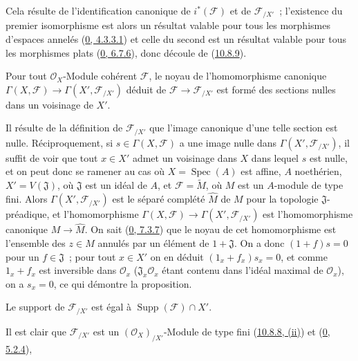 Cela résulte de l'identification canonique de $i^*(\mathscr{F})$ et de
$\mathscr{F}_{/X'}$~; l'existence du premier isomorphisme est alors un
résultat valable pour tous les morphismes d'espaces annelés
(\hyperref[0.4.3.3.1-fr]{0, 4.3.3.1}) et celle du second est un résultat
valable pour tous les morphismes plats
(\hyperref[0.6.7.6-fr]{0, 6.7.6}), donc découle de
(\hyperref[I.10.8.9-fr]{10.8.9}).

\begin{proposition}[10.8.11]
\label{I.10.8.11-fr}
Pour tout $\mathscr{O}_X$-Module cohérent $\mathscr{F}$, le noyau de
l'homomorphisme canonique
$\Gamma(X,\mathscr{F})\to\Gamma(X',\mathscr{F}_{/X'})$ déduit de
$\mathscr{F}\to\mathscr{F}_{/X'}$ est formé des sections nulles dans un
voisinage de $X'$.
\end{proposition}

Il résulte de la définition de $\mathscr{F}_{/X'}$ que l'image canonique
d'une telle section est nulle. Réciproquement, si
$s\in\Gamma(X,\mathscr{F})$ a une image nulle dans
$\Gamma(X',\mathscr{F}_{/X'})$, il suffit de voir que tout $x\in X'$ admet
un voisinage dans $X$ dans lequel $s$ est nulle, et on peut donc se ramener
au cas où $X=\operatorname{Spec}(A)$ est affine, $A$ noethérien,
$X'=V(\mathfrak{J})$, où $\mathfrak{J}$ est un idéal de $A$, et
$\mathscr{F}=\widetilde M$, où $M$ est un $A$-module de type fini. Alors
$\Gamma(X',\mathscr{F}_{/X'})$ est le séparé complété $\widehat M$ de $M$
pour la topologie $\mathfrak{J}$-préadique, et l'homomorphisme
$\Gamma(X,\mathscr{F})\to\Gamma(X',\mathscr{F}_{/X'})$ est
l'homomorphisme canonique $M\to\widehat M$. On sait
(\hyperref[0.7.3.7-fr]{0, 7.3.7}) que le noyau de cet homomorphisme est
l'ensemble des $z\in M$ annulés par un élément de $1+\mathfrak{J}$. On a
donc $(1+f)s=0$ pour un $f\in\mathfrak{J}$~; pour tout $x\in X'$ on en
déduit $(1_x+f_x)s_x=0$, et comme $1_x+f_x$ est inversible dans
$\mathscr{O}_x$ ($\mathfrak{J}_x\mathscr{O}_x$ étant contenu dans l'idéal
maximal de $\mathscr{O}_x$), on a $s_x=0$, ce qui démontre la proposition.

\begin{corollary}[10.8.12]
\label{I.10.8.12-fr}
Le support de $\mathscr{F}_{/X'}$ est égal à
$\operatorname{Supp}(\mathscr{F})\cap X'$.
\end{corollary}

Il est clair que $\mathscr{F}_{/X'}$ est un
$(\mathscr{O}_X)_{/X'}$-Module de type fini
(\hyperref[I.10.8.8-fr]{10.8.8, (ii)}) et
(\hyperref[0.5.2.4-fr]{0, 5.2.4}),

